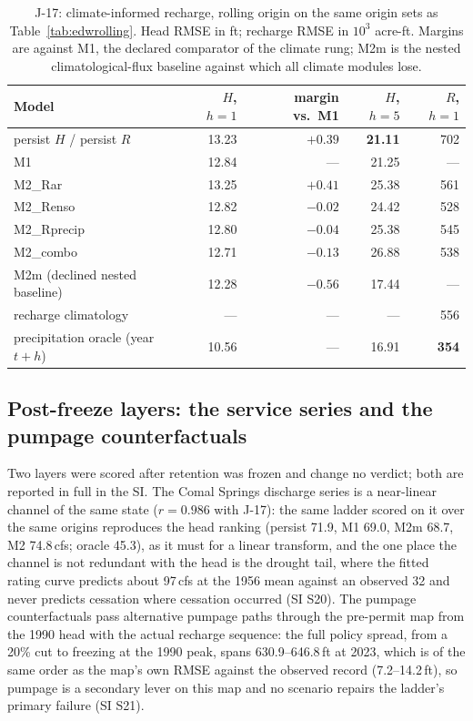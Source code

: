 \documentclass[preprint,11pt,authoryear]{elsarticle}
\theoremstyle{definition}
\theoremstyle{remark}
\begin{document}
\begin{table}[!htb]
\centering\small
\caption{J-17: climate-informed recharge, rolling origin on the same origin sets as Table~\ref{tab:edwrolling}. Head RMSE in ft; recharge RMSE in $10^3$ acre-ft. Margins are against M1, the declared comparator of the climate rung; M2m is the nested climatological-flux baseline against which all climate modules lose.}
\label{tab:edwclimate}
\begin{tabular}{@{}lrrrr@{}}
\toprule
Model & $H$, $h{=}1$ & margin vs.\ M1 & $H$, $h{=}5$ & $R$, $h{=}1$ \\
\midrule
persist $H$ / persist $R$ & 13.23 & $+0.39$ & \textbf{21.11} & 702 \\
M1 & 12.84 & --- & 21.25 & --- \\
M2\_Rar & 13.25 & $+0.41$ & 25.38 & 561 \\
M2\_Renso & 12.82 & $-0.02$ & 24.42 & 528 \\
M2\_Rprecip & 12.80 & $-0.04$ & 25.38 & 545 \\
M2\_combo & 12.71 & $-0.13$ & 26.88 & 538 \\
M2m (declined nested baseline) & 12.28 & $-0.56$ & 17.44 & --- \\
recharge climatology & --- & --- & --- & 556 \\
precipitation oracle (year $t{+}h$) & 10.56 & --- & 16.91 & \textbf{354} \\
\bottomrule
\end{tabular}
\end{table}

\subsection{Post-freeze layers: the service series and the pumpage counterfactuals}\label{sec:edw_post}

Two layers were scored after retention was frozen and change no verdict; both are reported in full in the SI. The Comal Springs discharge series is a near-linear channel of the same state ($r=0.986$ with J-17): the same ladder scored on it over the same origins reproduces the head ranking (persist 71.9, M1 69.0, M2m 68.7, M2 74.8\,cfs; oracle 45.3), as it must for a linear transform, and the one place the channel is not redundant with the head is the drought tail, where the fitted rating curve predicts about 97\,cfs at the 1956 mean against an observed 32 and never predicts cessation where cessation occurred (SI S20). The pumpage counterfactuals pass alternative pumpage paths through the pre-permit map from the 1990 head with the actual recharge sequence: the full policy spread, from a 20\% cut to freezing at the 1990 peak, spans 630.9--646.8\,ft at 2023, which is of the same order as the map's own RMSE against the observed record (7.2--14.2\,ft), so pumpage is a secondary lever on this map and no scenario repairs the ladder's primary failure (SI S21).
\end{document}

